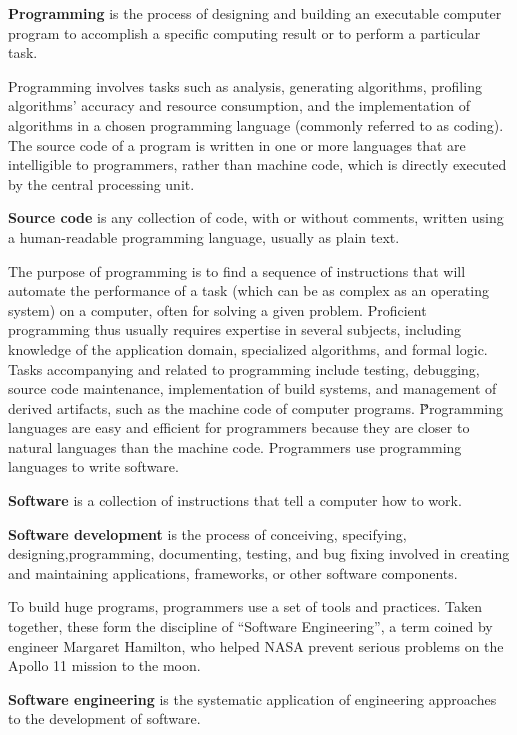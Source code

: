\bd[Programming]
\textbf{Programming} is the process of designing and building an executable computer program to accomplish a specific
computing result or to perform a particular task.
\ed

Programming involves tasks such as analysis, generating algorithms, profiling algorithms' accuracy and resource
consumption, and the implementation of algorithms in a chosen programming language (commonly referred to as coding).
The source code of a program is written in one or more languages that are intelligible to programmers, rather than
machine code, which is directly executed by the central processing unit.

\textbf{Source code} is any collection of code, with or without comments, written using a human-readable programming
language, usually as plain text.
\ed

The purpose of programming is to find a sequence of instructions that will automate the performance of a task (which
can be as complex as an operating system) on a computer, often for solving a given problem. Proficient programming
thus usually requires expertise in several subjects, including knowledge of the application domain,
specialized algorithms, and formal logic. Tasks accompanying and related to programming include testing, debugging,
source code maintenance, implementation of build systems, and management of derived artifacts, such as the machine
code of computer programs. \v

Programming languages are easy and efficient for programmers because they are closer to natural languages than the
machine code. Programmers use programming languages to write software.

\bd[Software]
\textbf{Software} is a collection of instructions that tell a computer how to work.
\ed

\textbf{Software development} is the process of conceiving, specifying, designing,programming, documenting, testing,
and bug fixing involved in creating and maintaining applications, frameworks, or other software components.
\ed

To build huge programs, programmers use a set of tools and practices. Taken together, these form the discipline of
``Software Engineering'', a term coined by engineer Margaret Hamilton, who helped NASA prevent serious problems on
the Apollo 11 mission to the moon.

\textbf{Software engineering} is the systematic application of engineering approaches to the development of software.
\ed

